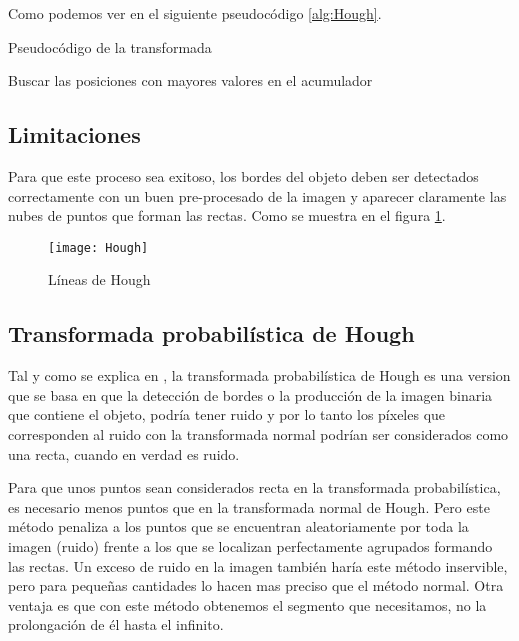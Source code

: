 Como podemos ver en el siguiente pseudocódigo 
\ref{alg:Hough}.

\label{alg:Hough}
\begin{algorithm*}
\caption{Pseudocódigo de la transformada}
\DontPrintSemicolon
{}


Buscar las posiciones con mayores valores en el acumulador\;	

\end{algorithm*}

\subsection{Limitaciones}
Para que este proceso sea exitoso, los bordes del objeto deben ser detectados correctamente con un buen pre-procesado de la imagen y aparecer claramente las nubes de puntos que forman las rectas.
Como se muestra en el figura \ref{fig:3.5}.

\begin{figure}[h]
\centering
\texttt{[image: Hough]}
\caption{Líneas de Hough\cite{opencv:HoughIm}}
\label{fig:3.5}
\end{figure}
\subsection{Transformada probabilística de Hough}

Tal y como se explica en \cite{Kiryati20001157}, la transformada probabilística de Hough es una version que se basa en que la detección de bordes o la producción de la imagen binaria que contiene el objeto, podría tener ruido y por lo tanto los píxeles que corresponden al ruido con la transformada normal podrían ser considerados como una recta, cuando en verdad es ruido.

Para que unos puntos sean considerados recta en la transformada probabilística, es necesario menos puntos que en la transformada normal de Hough.
Pero este método penaliza a los puntos que se encuentran aleatoriamente por toda la imagen (ruido) frente a los que se localizan perfectamente agrupados formando las rectas. 
Un exceso de ruido en la imagen también haría este método inservible, pero para pequeñas cantidades lo hacen mas preciso que el método normal.
Otra ventaja es que con este método obtenemos el segmento que necesitamos, no la prolongación de él hasta el infinito.

